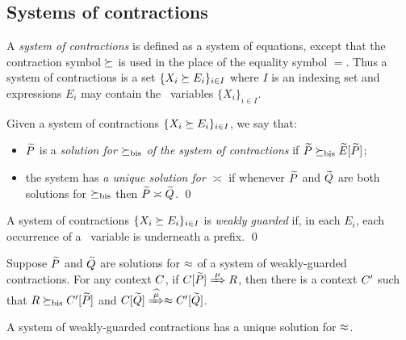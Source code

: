\subsection{Systems of contractions}
\label{ss:SysContr}

A \emph{system of contractions} is defined as a system of equations,
except that the contraction symbol $\mathrel{\succeq}$ is used in the place of
the equality symbol $=$. Thus a system of contractions is a set 
$\{  X_i \mathrel{\succeq} E_i\}_{i\in I}$
where $I$ is an  indexing set and expressions
$E_i$  may contain the  \behavC\  variables 
$\{  X_i\}_{i\in I}$.

\begin{definition}
\label{d:uni_contra}
Given a  system of contractions 
$\{  X_i \mathrel{\succeq} E_i\}_{i\in I}$, 
 we say that:
\begin{itemize}
\item
 $\widetilde P$ is a \emph{solution  for $\mathrel{\succeq_{\rm{bis}}}$ of the 
 system of contractions} 
 if $\widetilde P \mathrel{\succeq_{\rm{bis}}} \widetilde E [\widetilde P]$;
\item 
the system  
has  \emph{a unique 
solution for $\asymp$}
if 
whenever 
 $\widetilde P$ and $\widetilde Q$ are both solutions  for  $\mathrel{\succeq_{\rm{bis}}}$
 then $\widetilde P \asymp \widetilde Q$.
\qed\end{itemize}
\end{definition}
  


\begin{definition}
\label{d:guarded}
A system of contractions $\{  X_i \mathrel{\succeq} E_i\}_{i\in I}$
 is
\emph{weakly guarded}
if,  in each    $E_i$, each occurrence of
a \behavC\ variable is underneath a prefix.
\qed\end{definition}




 
\begin{lemma}
\label{l:uptocon}
Suppose $\widetilde P$ and $\widetilde Q$ are solutions  for $\approx$
 of a system of weakly-guarded
contractions.
For any context $C$, 
if  $\ct{\til P}\Arr{\mu}  R$,
 then 
there is a  context $C'$
such that $R \mathrel{\succeq_{\rm{bis}}} C' [\widetilde P]$ and  $\ct{\til Q} \Arcap{\mu}
 \wb \ctp{\til Q}$.
\end{lemma}
   


\begin{theorem}
\label{t:contra_bisimulation_u}
A system of weakly-guarded contractions
    has 
a unique solution 
 for $\approx$.
\end{theorem} 

